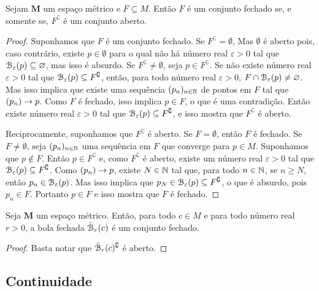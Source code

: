 \begin{prop}
Sejam $\bm M$ um espaço métrico e $F \subseteq M$. Então $F$ é um conjunto fechado se, e somente se, $F^\complement$ é um conjunto aberto.
\end{prop}
\begin{proof}
Suponhamos que $F$ é um conjunto fechado. Se $F^\complement = \emptyset$, Mas $\emptyset$ é aberto pois, caso contrário, existe $p \in \emptyset$ para o qual não há número real $\varepsilon > 0$ tal que $\mathcal{B}_\varepsilon(p) \subseteq \varnothing$, mas isso é absurdo. Se $F^\complement \neq \emptyset$, seja $p \in F^\complement$. Se não existe número real $\varepsilon > 0$ tal que $\mathcal{B}_\varepsilon(p) \subseteq F^\complement$, então, para todo número real $\varepsilon > 0$, $F \cap \mathcal{B}_\varepsilon(p) \neq \varnothing$. Mas isso implica que existe uma sequência $(p_n)_{n \in \mathbb{N}}$ de pontos em $F$ tal que $(p_n) \rightarrow p$. Como $F$ é fechado, isso implica $p \in F$, o que é uma contradição. Então existe número real $\varepsilon > 0$ tal que $\mathcal{B}_\varepsilon(p) \subseteq F^\complement$, e isso mostra que $F^\complement$ é aberto.
	
Reciprocamente, suponhamos que $F^\complement$ é aberto. Se $F = \emptyset$, então $F$ é fechado. Se $F \neq \emptyset$, seja $(p_n)_{n \in \mathbb{N}}$ uma sequência em $F$ que converge para $p \in M$. Suponhamos que $p \notin F$. Então $p \in F^\complement$ e, como $F^\complement$ é aberto, existe um número real $\varepsilon > 0$ tal que $\mathcal{B}_\varepsilon(p) \subseteq F^\complement$. Como $(p_n) \rightarrow p$, existe $N \in \mathbb{N}$ tal que, para todo $n \in \mathbb{N}$, se $n \geq N$, então $p_n \in \mathcal{B}_\varepsilon(p)$. Mas isso implica que $p_N \in \mathcal{B}_\varepsilon(p) \subseteq F^\complement$, o que é absurdo, pois $p_n \in F$. Portanto $p \in F$ e isso mostra que $F$ é fechado.
\end{proof}

\begin{prop}
Seja $\bm M$ um espaço métrico. Então, para todo $c \in M$ e para todo número real $r > 0$, a bola fechada $\bar{\mathcal{B}}_r(c)$ é um conjunto fechado.
\end{prop}
\begin{proof}
Basta notar que $\bar{\mathcal{B}}_r(c)^\complement$ é aberto.
\end{proof}

\subsection{Continuidade}

